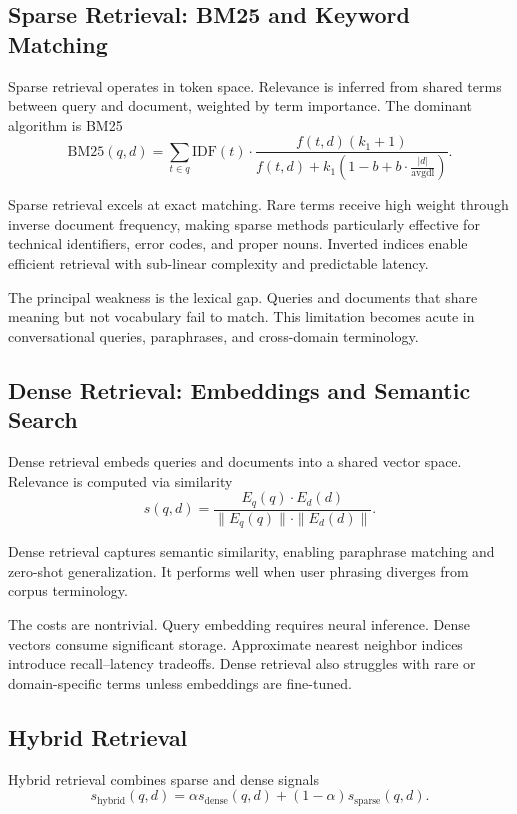 \subsection{Sparse Retrieval: BM25 and Keyword Matching}

Sparse retrieval operates in token space. Relevance is inferred from shared terms between query and document, weighted by term importance. The dominant algorithm is BM25
\[
\text{BM25}(q, d) = \sum_{t \in q} \text{IDF}(t) \cdot 
\frac{f(t, d)(k_1 + 1)}{f(t, d) + k_1\left(1 - b + b \cdot \frac{|d|}{\text{avgdl}}\right)}.
\]

Sparse retrieval excels at exact matching. Rare terms receive high weight through inverse document frequency, making sparse methods particularly effective for technical identifiers, error codes, and proper nouns. Inverted indices enable efficient retrieval with sub-linear complexity and predictable latency.

The principal weakness is the lexical gap. Queries and documents that share meaning but not vocabulary fail to match. This limitation becomes acute in conversational queries, paraphrases, and cross-domain terminology.

\subsection{Dense Retrieval: Embeddings and Semantic Search}

Dense retrieval embeds queries and documents into a shared vector space. Relevance is computed via similarity
\[
s(q,d) = \frac{E_q(q) \cdot E_d(d)}{\|E_q(q)\| \cdot \|E_d(d)\|}.
\]

Dense retrieval captures semantic similarity, enabling paraphrase matching and zero-shot generalization. It performs well when user phrasing diverges from corpus terminology.

The costs are nontrivial. Query embedding requires neural inference. Dense vectors consume significant storage. Approximate nearest neighbor indices introduce recall–latency tradeoffs. Dense retrieval also struggles with rare or domain-specific terms unless embeddings are fine-tuned.

\subsection{Hybrid Retrieval}

Hybrid retrieval combines sparse and dense signals
\[
s_{\text{hybrid}}(q,d) = \alpha s_{\text{dense}}(q,d) + (1-\alpha)s_{\text{sparse}}(q,d).
\]

